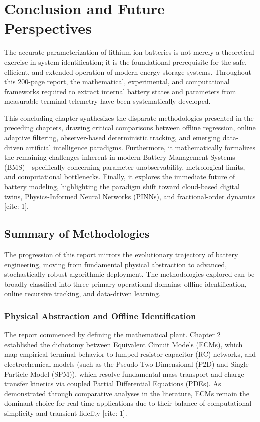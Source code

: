
\chapter{Conclusion and Future Perspectives}
\label{chap:conclusion}

The accurate parameterization of lithium-ion batteries is not merely a theoretical exercise in system identification; it is the foundational prerequisite for the safe, efficient, and extended operation of modern energy storage systems. Throughout this 200-page report, the mathematical, experimental, and computational frameworks required to extract internal battery states and parameters from measurable terminal telemetry have been systematically developed. 

This concluding chapter synthesizes the disparate methodologies presented in the preceding chapters, drawing critical comparisons between offline regression, online adaptive filtering, observer-based deterministic tracking, and emerging data-driven artificial intelligence paradigms. Furthermore, it mathematically formalizes the remaining challenges inherent in modern Battery Management Systems (BMS)—specifically concerning parameter unobservability, metrological limits, and computational bottlenecks. Finally, it explores the immediate future of battery modeling, highlighting the paradigm shift toward cloud-based digital twins, Physics-Informed Neural Networks (PINNs), and fractional-order dynamics \cite{lucu2018critical}[cite: 1].

\section{Summary of Methodologies}
\label{sec:summary_methodologies}

The progression of this report mirrors the evolutionary trajectory of battery engineering, moving from fundamental physical abstraction to advanced, stochastically robust algorithmic deployment. The methodologies explored can be broadly classified into three primary operational domains: offline identification, online recursive tracking, and data-driven learning.

\subsection{Physical Abstraction and Offline Identification}
\label{subsec:summary_offline}

The report commenced by defining the mathematical plant. Chapter 2 established the dichotomy between Equivalent Circuit Models (ECMs), which map empirical terminal behavior to lumped resistor-capacitor (RC) networks, and electrochemical models (such as the Pseudo-Two-Dimensional (P2D) and Single Particle Model (SPM)), which resolve fundamental mass transport and charge-transfer kinetics via coupled Partial Differential Equations (PDEs). As demonstrated through comparative analyses in the literature, ECMs remain the dominant choice for real-time applications due to their balance of computational simplicity and transient fidelity \cite{hu2012comparative}[cite: 1].

